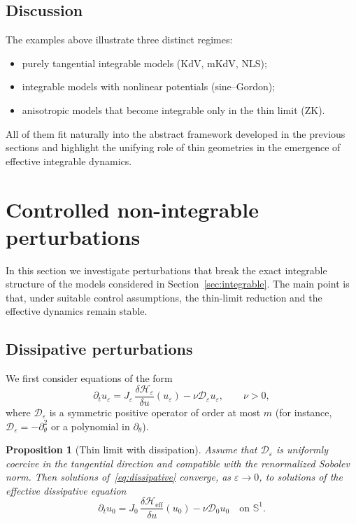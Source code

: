 \documentclass[11pt]{amsart}
\theoremstyle{plain}
\newtheorem{proposition}[theorem]{Proposition}
\theoremstyle{definition}
\theoremstyle{remark}
\theoremstyle{remark}
\begin{document}
\subsection{Discussion}

The examples above illustrate three distinct regimes:
\begin{itemize}
\item purely tangential integrable models (KdV, mKdV, NLS);
\item integrable models with nonlinear potentials (sine--Gordon);
\item anisotropic models that become integrable only in the thin limit (ZK).
\end{itemize}
All of them fit naturally into the abstract framework developed in the previous
sections and highlight the unifying role of thin geometries in the emergence of
effective integrable dynamics.


\section{Controlled non-integrable perturbations}
\label{sec:nonintegrable}

In this section we investigate perturbations that break the exact integrable
structure of the models considered in Section~\ref{sec:integrable}.
The main point is that, under suitable control assumptions, the thin-limit
reduction and the effective dynamics remain stable.

\subsection{Dissipative perturbations}

We first consider equations of the form
\begin{equation}
\label{eq:dissipative}
\partial_t u_\varepsilon
=
J_\varepsilon\,\frac{\delta\mathcal H_\varepsilon}{\delta u}(u_\varepsilon)
-
\nu \mathcal D_\varepsilon u_\varepsilon,
\qquad \nu>0,
\end{equation}
where $\mathcal D_\varepsilon$ is a symmetric positive operator of order at most
$m$ (for instance, $\mathcal D_\varepsilon=-\partial_\theta^2$ or a polynomial
in $\partial_\theta$).

\begin{proposition}[Thin limit with dissipation]
\label{prop:dissipation}
Assume that $\mathcal D_\varepsilon$ is uniformly coercive in the tangential
direction and compatible with the renormalized Sobolev norm.
Then solutions of~\eqref{eq:dissipative} converge, as $\varepsilon\to0$, to
solutions of the effective dissipative equation
\[
\partial_t u_0
=
J_0\,\frac{\delta\mathcal H_{\mathrm{eff}}}{\delta u}(u_0)
-
\nu \mathcal D_0 u_0
\quad\text{on }\mathbb S^1.
\]
\end{proposition}
\end{document}
